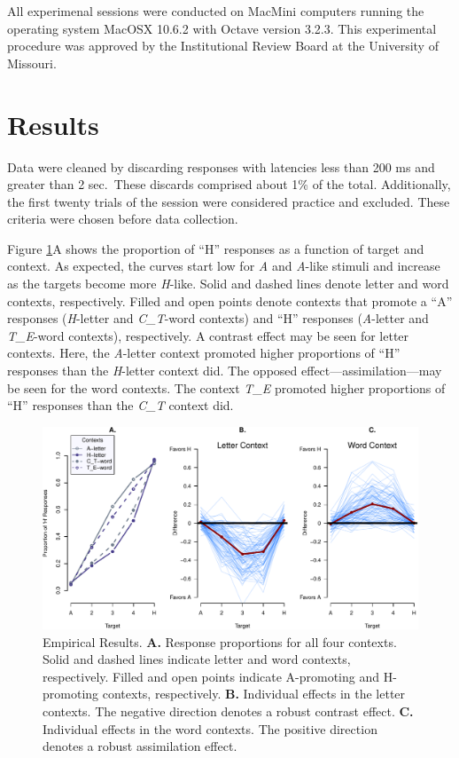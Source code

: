 \documentclass[english,floatsintext,man]{apa6}
\begin{document}
All experimenal sessions were conducted on MacMini computers running the
operating system MacOSX 10.6.2 with Octave version 3.2.3. This
experimental procedure was approved by the Institutional Review Board at
the University of Missouri.

\section{Results}\label{results}

Data were cleaned by discarding responses with latencies less than 200
ms and greater than 2 sec.~These discards comprised about 1\% of the
total. Additionally, the first twenty trials of the session were
considered practice and excluded. These criteria were chosen before data
collection.

Figure \ref{fig:avcfigures}A shows the proportion of \enquote{H}
responses as a function of target and context. As expected, the curves
start low for \emph{A} and \emph{A}-like stimuli and increase as the
targets become more \emph{H}-like. Solid and dashed lines denote letter
and word contexts, respectively. Filled and open points denote contexts
that promote a \enquote{A} responses (\emph{H}-letter and
\emph{C\_T}-word contexts) and \enquote{H} responses (\emph{A}-letter
and \emph{T\_E}-word contexts), respectively. A contrast effect may be
seen for letter contexts. Here, the \emph{A}-letter context promoted
higher proportions of \enquote{H} responses than the \emph{H}-letter
context did. The opposed effect---assimilation---may be seen for the
word contexts. The context \emph{T\_E} promoted higher proportions of
\enquote{H} responses than the \emph{C\_T} context did.

\begin{figure}[htbp]
\centering
\includegraphics{paper_files/figure-latex/avcfigures-1.pdf}
\caption{\label{fig:avcfigures}Empirical Results. \textbf{A.} Response
proportions for all four contexts. Solid and dashed lines indicate
letter and word contexts, respectively. Filled and open points indicate
A-promoting and H-promoting contexts, respectively. \textbf{B.}
Individual effects in the letter contexts. The negative direction
denotes a robust contrast effect. \textbf{C.} Individual effects in the
word contexts. The positive direction denotes a robust assimilation
effect.}
\end{figure}
\end{document}
